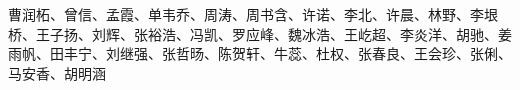 \documentclass[11pt]{book} %
\begin{document}
\newpage
~\vfill
\thispagestyle{empty}

{\large
{} \\

\noindent 曹润柘、曾信、孟霞、单韦乔、周涛、周书含、许诺、李北、许晨、林野、李垠桥、王子扬、刘辉、张裕浩、冯凯、罗应峰、魏冰浩、王屹超、李炎洋、胡驰、姜雨帆、田丰宁、刘继强、张哲旸、陈贺轩、牛蕊、杜权、张春良、王会珍、张俐、马安香、胡明涵 \\

}

\newpage


{} %
\pagestyle{empty} %
\tableofcontents %
\cleardoublepage %
\pagestyle{fancy} %


















\cleardoublepage %
\printbibliography


\cleardoublepage %
\printindex %


\end{document}
